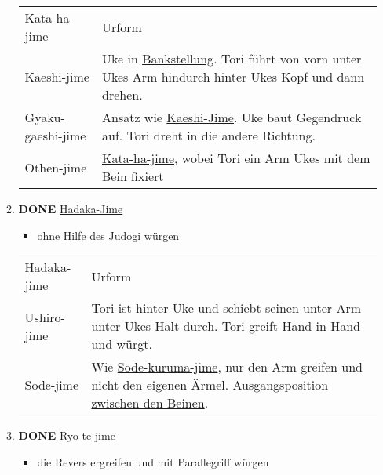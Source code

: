 \documentclass[11pt]{article}
\begin{document}
\begin{enumerate}
\begin{enumerate}
\begin{center}
\begin{tabular}{ll}
\label{org9b25391}Kata-ha-jime & Urform\footnotemark\\
\label{org880cf97}Kaeshi-jime & Uke in \hyperref[orgbc37293]{Bankstellung}. Tori führt von vorn unter Ukes Arm hindurch hinter Ukes Kopf und dann drehen.\\
\label{org4db1615}Gyaku-gaeshi-jime & Ansatz wie \hyperref[org880cf97]{Kaeshi-Jime}. Uke baut Gegendruck auf. Tori dreht in die andere Richtung.\\
\label{org404d9c1}Othen-jime & \hyperref[org9b25391]{Kata-ha-jime}, wobei Tori ein Arm Ukes mit dem Bein fixiert\\
\end{tabular}
\end{center}

\item {\bfseries\sffamily DONE} \hyperref[orgaed2942]{Hadaka-Jime}
\label{sec:org3791a66}
\begin{itemize}
\item ohne Hilfe des Judogi würgen
\end{itemize}

\begin{center}
\begin{tabular}{ll}
\label{orgaed2942}Hadaka-jime & Urform\footnotemark\\
\label{orgc19b903}Ushiro-jime & Tori ist hinter Uke und schiebt seinen unter Arm unter Ukes Halt durch. Tori greift Hand in Hand und würgt.\\
\label{org94ab00d}Sode-jime & Wie \hyperref[orgdc4236f]{Sode-kuruma-jime}, nur den Arm greifen und nicht den eigenen Ärmel. Ausgangsposition \hyperref[orgd3451e7]{zwischen den Beinen}.\\
\end{tabular}
\end{center}

\item {\bfseries\sffamily DONE} \hyperref[org4d43bbc]{Ryo-te-jime}
\label{sec:org01e4b86}
\begin{itemize}
\item die Revers ergreifen und mit Parallegriff würgen
\end{itemize}


\end{enumerate}
\end{enumerate}
\end{document}
